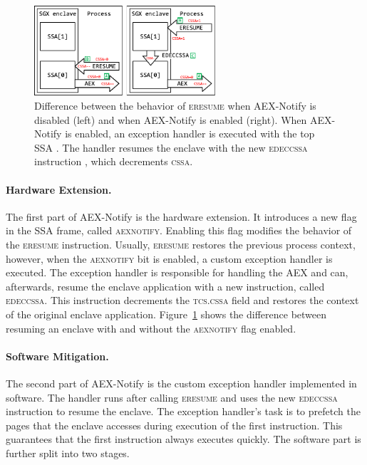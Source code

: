 \documentclass{llncs}
\begin{document}
\begin{figure}[t]
  \centering
  \includegraphics[width=0.6\textwidth]{images/sgx-ssa-edeccssa.pdf}
  \caption{
    Difference between the behavior of \textsc{eresume} when AEX-Notify is
    disabled (left) and when AEX-Notify is enabled (right).
    When AEX-Notify is enabled, an exception handler is executed with the top
    SSA \protect{}.
    The handler resumes the enclave with the new \textsc{edeccssa} instruction
    \protect{}, which decrements \textsc{cssa}.}
  \label{fig:aex-notify-edeccssa}
\end{figure}

\paragraph{Hardware Extension.}
The first part of AEX-Notify is the hardware extension.
It introduces a new flag in the SSA frame, called \textsc{aexnotify}.
Enabling this flag modifies the behavior of the \textsc{eresume} instruction.
Usually, \textsc{eresume} restores the previous process context, however, when
the \textsc{aexnotify} bit is enabled, a custom exception handler is executed.
The exception handler is responsible for handling the AEX and can, afterwards,
resume the enclave application with a new instruction, called \textsc{edeccssa}.
This instruction decrements the \textsc{tcs.cssa} field and restores the
context of the original enclave application.
Figure~\ref{fig:aex-notify-edeccssa} shows the difference between resuming an
enclave with and without the \textsc{aexnotify} flag enabled.

\paragraph{Software Mitigation.}
The second part of AEX-Notify is the custom exception handler implemented in
software.
The handler runs after calling \textsc{eresume} and
uses the new \textsc{edeccssa} instruction to resume the enclave.
The exception handler's task is to prefetch the pages that the enclave accesses
during execution of the first instruction.
This guarantees that the first instruction always executes quickly.
The software part is further split into two stages.
\end{document}
